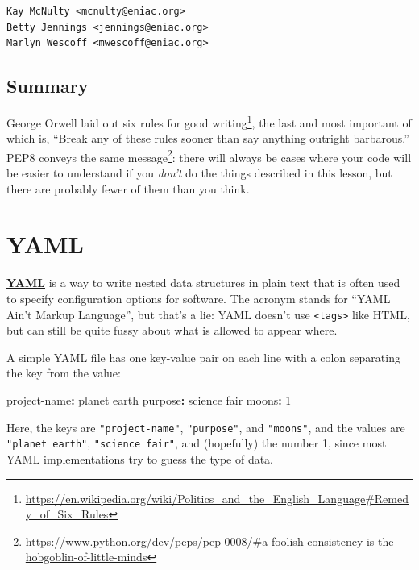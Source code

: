 \documentclass[
]{krantz}
\makeatletter
\newenvironment{Shaded}{\begin{snugshade}}{\end{snugshade}}
\newcommand{\AttributeTok}[1]{\textcolor[rgb]{0.77,0.63,0.00}{#1}}
\newcommand{\DecValTok}[1]{\textcolor[rgb]{0.00,0.00,0.81}{#1}}
\newcommand{\FunctionTok}[1]{\textcolor[rgb]{0.00,0.00,0.00}{#1}}
\newcommand{\KeywordTok}[1]{\textcolor[rgb]{0.13,0.29,0.53}{\textbf{#1}}}
\renewcommand{\href}[2]{#2\footnote{\url{#1}}}
\newenvironment{kframe}{%
\medskip{}
\setlength{\fboxsep}{.8em}
 \def\at@end@of@kframe{}%
 \ifinner\ifhmode%
  \def\at@end@of@kframe{\end{minipage}}%
  \begin{minipage}{\columnwidth}%
 \fi\fi%
 \def\FrameCommand##1{\hskip\@totalleftmargin \hskip-\fboxsep
 \colorbox{shadecolor}{##1}\hskip-\fboxsep
     \hskip-\linewidth \hskip-\@totalleftmargin \hskip\columnwidth}%
 \MakeFramed {\advance\hsize-\width
   \@totalleftmargin\z@ \linewidth\hsize
   \@setminipage}}%
 {\par\unskip\endMakeFramed%
 \at@end@of@kframe}
\renewenvironment{Shaded}{\begin{kframe}}{\end{kframe}}
\newcommand{\gref}[2]{\hyperlink{#2}{\textbf{#1}}}
\makeatother
\begin{document}
\begin{verbatim}
Kay McNulty <mcnulty@eniac.org>
Betty Jennings <jennings@eniac.org>
Marlyn Wescoff <mwescoff@eniac.org>
\end{verbatim}

\hypertarget{style-summary}{%
\section{Summary}\label{style-summary}}

George Orwell laid out \href{https://en.wikipedia.org/wiki/Politics_and_the_English_Language\#Remedy_of_Six_Rules}{six rules for good writing},
the last and most important of which is,
``Break any of these rules sooner than say anything outright barbarous.''
PEP8 conveys \href{https://www.python.org/dev/peps/pep-0008/\#a-foolish-consistency-is-the-hobgoblin-of-little-minds}{the same message}:
there will always be cases where your code will be easier to understand
if you \emph{don't} do the things described in this lesson,
but there are probably fewer of them than you think.

\hypertarget{yaml}{%
\chapter{YAML}\label{yaml}}

\gref{YAML}{yaml} is a way to write nested data structures in plain text
that is often used to specify configuration options for software.
The acronym stands for ``YAML Ain't Markup Language'',
but that's a lie:
YAML doesn't use \texttt{\textless{}tags\textgreater{}} like HTML,
but can still be quite fussy about what is allowed to appear where.

A simple YAML file has one key-value pair on each line
with a colon separating the key from the value:

\begin{Shaded}
\begin{Highlighting}[]
\FunctionTok{project{-}name}\KeywordTok{:}\AttributeTok{ planet earth}
\FunctionTok{purpose}\KeywordTok{:}\AttributeTok{ science fair}
\FunctionTok{moons}\KeywordTok{:}\AttributeTok{ }\DecValTok{1}
\end{Highlighting}
\end{Shaded}

Here,
the keys are \texttt{"project-name"}, \texttt{"purpose"}, and \texttt{"moons"},
and the values are \texttt{"planet\ earth"},
\texttt{"science\ fair"},
and (hopefully) the number 1,
since most YAML implementations try to guess the type of data.
\end{document}
